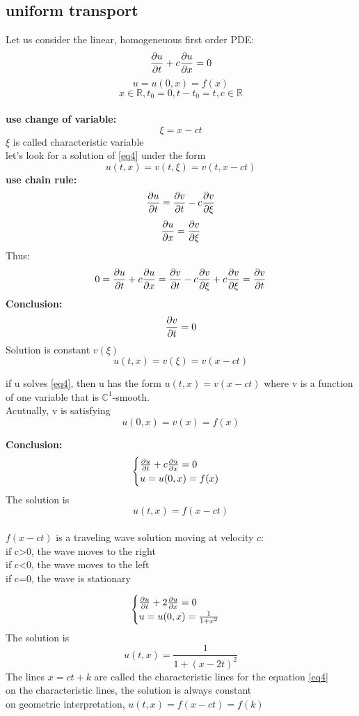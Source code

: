 \subsection{uniform transport}
Let us consider the linear, homogeneuous first order PDE:
\begin{equation}
    \label{eq4} \pdv{u}{t}+c\pdv{u}{x}=0
\end{equation}
\begin{equation}
    \label{eq5} u=u(0,x)=f(x)
\end{equation}
$$
    x\in \mathbb{R},t_0=0,t-t_0=t,c\in \mathbb{R}
$$ 
\\\textbf{use change of variable:}  
$$
    \xi =x-ct
$$ 
$ \xi $ is called characteristic variable
\\let's look for a solution of \eqref{eq4} under the form $$ u(t,x)=v(t,\xi)=v(t,x-ct) $$ 
\textbf{use chain rule:}
$$
    \pdv{u}{t}=\pdv{v}{t}-c\pdv{v}{\xi}
$$ 
$$
    \pdv{u}{x}=\pdv{v}{\xi}
$$ 
Thus:
$$
    0=\pdv{u}{t}+c\pdv{u}{x}=\pdv{v}{t}-c\pdv{v}{\xi}+c\pdv{v}{\xi}= \pdv{v}{t}
$$ 
\textbf{Conclusion:}$$
    \pdv{v}{t}=0
$$ 
Solution is constant $ v(\xi) $
$$
u(t,x)=v(\xi)=v(x-ct)
$$  
\begin{proposition}{}{}
if u solves \eqref{eq4}, then u has the form $u(t,x)=v(x-ct)$ where v is a function of one variable that is $ \mathbb{C}^1 $-smooth.
\\Acutually, v is satisfying $$
    u(0,x)=v(x)=f(x)
$$ 
\end{proposition}
\textbf{Conclusion:}
$$\begin{cases}
    \pdv{u}{t}+c\pdv{u}{x}=0
    \\ 
    u=u(0,x)=f(x)
\end{cases}$$
The solution is $$ u(t,x)=f(x-ct) $$ 
\\$ f(x-ct) $ is a traveling wave solution moving at velocity $ c $:
\\if c>0, the wave moves to the right
\\if c<0, the wave moves to the left
\\if c=0, the wave is stationary 
\begin{example}{}{}
$$\begin{cases}
    \pdv{u}{t}+2\pdv{u}{x}=0
    \\ 
    u=u(0,x)=\frac{1}{1+x^2}
\end{cases}$$
The solution is $$ u(t,x)=\frac{1}{1+(x-2t)^2} $$
The lines $ x=ct+k $ are called the characteristic lines for the equation \eqref{eq4}
\\on the characteristic lines, the solution is always constant
\\on geometric interpretation, $u(t,x)=f(x-ct)=f(k)$
\end{example}
